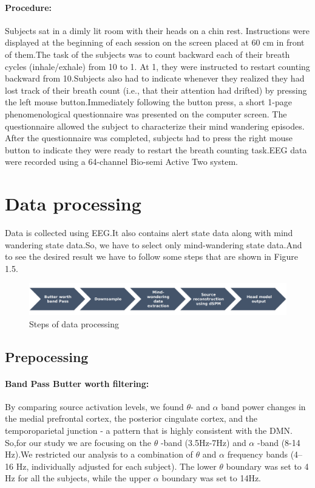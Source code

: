 \paragraph{Procedure:}
    Subjects sat in a dimly lit room with their heads on a chin rest. Instructions were displayed at the beginning of each session on the screen placed at 60 cm in front of them.The task of the subjects was to count backward each of their breath cycles (inhale/exhale) from 10 to 1. At 1, they were instructed to restart counting backward from 10.Subjects also had to indicate whenever they realized they had lost track of their breath count (i.e., that their attention had drifted) by pressing the left mouse button.Immediately following the button press, a short 1-page phenomenological questionnaire was presented on the computer screen. The questionnaire allowed the subject to characterize their mind wandering episodes. After the questionnaire was completed, subjects had to press the right mouse button to indicate they were ready to restart the breath counting task.EEG data were recorded using a 64-channel Bio-semi Active Two system.
    
\section{Data processing}
 Data is collected using EEG.It also contains alert state data along with mind wandering state data.So, we have to select only mind-wandering state data.And to see the desired result we have to follow some steps that are shown in Figure 1.5.  
 \begin{figure}
    \centering
    \includegraphics[width=15cm]{Pictures/Picture2.png}
    \caption{Steps of data processing}
    \label{fig:my_label1}
\end{figure}
\subsection{Prepocessing}
    \paragraph{Band Pass Butter worth filtering:} By comparing source  activation levels, we found $\theta$- and $\alpha$ band power changes in the medial prefrontal cortex, the posterior cingulate cortex, and the temporoparietal junction - a pattern that is highly consistent with the DMN. So,for our study we are focusing on the $\theta$ -band (3.5Hz-7Hz) and $\alpha$ -band (8-14 Hz).We restricted our analysis to a combination of $\theta$ and $\alpha$ frequency bands (4–16 Hz, individually adjusted for each subject). The lower $\theta$ boundary was set to 4 Hz for all the subjects, while the upper $\alpha$ boundary was set to 14Hz.
